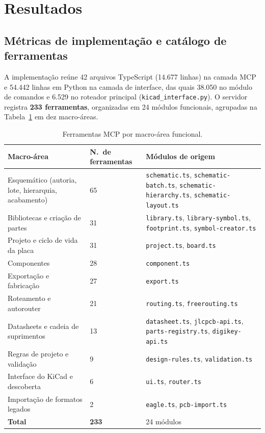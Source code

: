 \section{Resultados}\label{sec:resultados}

\subsection{Métricas de implementação e catálogo de ferramentas}

A implementação reúne 42 arquivos TypeScript (14.677 linhas) na camada MCP e
54.442 linhas em Python na camada de interface, das quais 38.050 no módulo de
comandos e 6.529 no roteador principal (\texttt{kicad\_interface.py}). O
servidor registra \textbf{233 ferramentas}, organizadas em 24 módulos
funcionais, agrupadas na Tabela~\ref{tab:categorias} em dez macro-áreas.

\begin{table}[htbp]
\centering
\small
\caption{Ferramentas MCP por macro-área funcional.}
\label{tab:categorias}
\begin{tabular}{@{}p{5.6cm}p{1.6cm}p{7.2cm}@{}}
\toprule
\textbf{Macro-área} & \textbf{N.\ de ferramentas} & \textbf{Módulos de origem} \\
\midrule
Esquemático (autoria, lote, hierarquia, acabamento) & 65 & \texttt{schematic.ts}, \texttt{schematic-batch.ts}, \texttt{schematic-hierarchy.ts}, \texttt{schematic-layout.ts} \\
Bibliotecas e criação de partes & 31 & \texttt{library.ts}, \texttt{library-symbol.ts}, \texttt{footprint.ts}, \texttt{symbol-creator.ts} \\
Projeto e ciclo de vida da placa & 31 & \texttt{project.ts}, \texttt{board.ts} \\
Componentes & 28 & \texttt{component.ts} \\
Exportação e fabricação & 27 & \texttt{export.ts} \\
Roteamento e autorouter & 21 & \texttt{routing.ts}, \texttt{freerouting.ts} \\
Datasheets e cadeia de suprimentos & 13 & \texttt{datasheet.ts}, \texttt{jlcpcb-api.ts}, \texttt{parts-registry.ts}, \texttt{digikey-api.ts} \\
Regras de projeto e validação & 9 & \texttt{design-rules.ts}, \texttt{validation.ts} \\
Interface do KiCad e descoberta & 6 & \texttt{ui.ts}, \texttt{router.ts} \\
Importação de formatos legados & 2 & \texttt{eagle.ts}, \texttt{pcb-import.ts} \\
\midrule
\textbf{Total} & \textbf{233} & 24 módulos \\
\bottomrule
\end{tabular}
\end{table}

